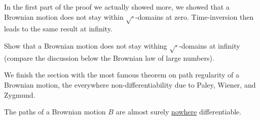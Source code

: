 In the first part of the proof we actually showed more, we showed that a Brownian motion does not stay within $\sqrt{\cdot}$-domains at zero. Time-inversion then leads to the same result at infinity.
\begin{luebung}
	Show that a Brownian motion does not stay withing $\sqrt{\cdot}$-domains at infinity (compare the discussion below the Brownian law of large numbers).
\end{luebung}


\marginpar{\textcolor{red}{Lecture 25}}
We finish the section with the most famous theorem on path regularity of a Brownian motion, the everywhere non-differentiability due to Paley, Wiener, and Zygmund.

\begin{lSatzHerz}
\begin{theorem}
	The paths of a Brownian motion $B$ are almost surely \underline{nowhere} differentiable.
\end{theorem}
\end{lSatzHerz}

